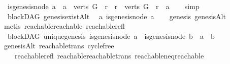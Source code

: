 \begin{isabellebody}
\ \ {\isachardoublequoteopen}{\isacharparenleft}{\kern0pt}is{\isacharunderscore}{\kern0pt}genesis{\isacharunderscore}{\kern0pt}node\ a{\isacharparenright}{\kern0pt}\ {\isasymlongleftrightarrow}\ {\isacharparenleft}{\kern0pt}{\isacharparenleft}{\kern0pt}a\ {\isasymin}\ verts\ G{\isacharparenright}{\kern0pt}\ {\isasymand}\ {\isacharparenleft}{\kern0pt}{\isasymforall}r{\isachardot}{\kern0pt}\ \ {\isacharparenleft}{\kern0pt}r\ {\isasymin}\ verts\ G{\isacharparenright}{\kern0pt}\ {\isasymlongrightarrow}\ r\ {\isasymrightarrow}\isactrlsup {\isacharasterisk}{\kern0pt}\ a{\isacharparenright}{\kern0pt}{\isacharparenright}{\kern0pt}{\isachardoublequoteclose}\isanewline
%
\isadelimproof
\ \ %
\endisadelimproof
%
\isatagproof
{}\isamarkupfalse%
\ simp%
\endisatagproof
{\isafoldproof}%
%
\isadelimproof
\isanewline
%
\endisadelimproof
\isanewline
{}\isamarkupfalse%
\ {\isacharparenleft}{\kern0pt}\ blockDAG{\isacharparenright}{\kern0pt}\ genesis{\isacharunderscore}{\kern0pt}existAlt{\isacharcolon}{\kern0pt}\isanewline
\ \ {\isachardoublequoteopen}{\isasymexists}a{\isachardot}{\kern0pt}\ is{\isacharunderscore}{\kern0pt}genesis{\isacharunderscore}{\kern0pt}node\ a{\isachardoublequoteclose}\isanewline
%
\isadelimproof
\ \ %
\endisadelimproof
%
\isatagproof
{}\isamarkupfalse%
\ genesis\ genesisAlt\isanewline
\ \ \isamarkupfalse%
\ {\isacharparenleft}{\kern0pt}metis\ reachable{}{\isacharunderscore}{\kern0pt}reachable\ reachable{\isacharunderscore}{\kern0pt}refl{\isacharparenright}{\kern0pt}%
\endisatagproof
{\isafoldproof}%
%
\isadelimproof
\ \ \isanewline
%
\endisadelimproof
\isanewline
{}\isamarkupfalse%
\ {\isacharparenleft}{\kern0pt}\ blockDAG{\isacharparenright}{\kern0pt}\ unique{\isacharunderscore}{\kern0pt}genesis{\isacharcolon}{\kern0pt}\ {\isachardoublequoteopen}is{\isacharunderscore}{\kern0pt}genesis{\isacharunderscore}{\kern0pt}node\ a\ {\isasymand}\ is{\isacharunderscore}{\kern0pt}genesis{\isacharunderscore}{\kern0pt}node\ b\ {\isasymlongrightarrow}\ a\ {\isacharequal}{\kern0pt}\ b{\isachardoublequoteclose}\isanewline
%
\isadelimproof
\ \ %
\endisadelimproof
%
\isatagproof
{}\isamarkupfalse%
\ genesisAlt\ reachable{\isacharunderscore}{\kern0pt}trans\ cycle{\isacharunderscore}{\kern0pt}free\isanewline
\ \ \ \ reachable{\isacharunderscore}{\kern0pt}refl\ reachable{\isacharunderscore}{\kern0pt}reachable{}{\isacharunderscore}{\kern0pt}trans\ reachable{\isacharunderscore}{\kern0pt}neq{\isacharunderscore}{\kern0pt}reachable{}\isanewline

\end{isabellebody}

